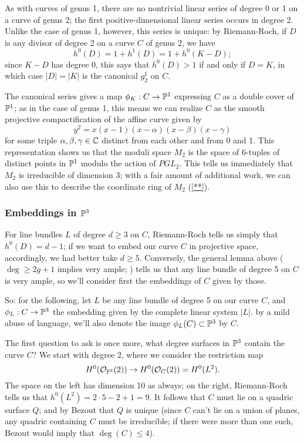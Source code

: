 As with curves of genus 1, there are no nontrivial linear series of degree 0 or 1 on a curve of genus 2; the first positive-dimensional linear series occurs in degree 2. Unlike the case of genus 1, however, this series is unique: by Riemann-Roch, if $D$ is any divisor of degree 2 on a curve $C$ of genus 2, we have
$$
h^0(D) = 1 + h^1(D) = 1 + h^0(K-D);
$$
since $K-D$ has degree 0, this says that $h^0(D) > 1$ if and only if $D=K$, in which case $|D| = |K|$ is the canonical $g^1_2$ on $C$.

The canonical series gives a map $\phi_K : C \to \PP^1$ expressing $C$ as a double cover of $\PP^1$; as in the case of genus 1, this means we can realize $C$ as the smooth projective compactification of the affine curve given by
$$
y^2 = x(x-1)(x - \alpha)(x - \beta)(x - \gamma)
$$
for some triple $\alpha,\beta,\gamma \in \CC$ distinct from each other and from 0 and 1. This representation shows us that the moduli space $M_2$ is the space of 6-tuples of distinct points in $\PP^1$ modulo the action of $PGL_2$. This tells us immediately that $M_2$ is irreducible of dimension 3; with a fair amount of additional work, we can also use this to describe the coordinate ring of $M_2$ (\ref{**}).

\subsubsection{Embeddings in $\PP^3$}

For line bundles $L$ of degree $d \geq 3$ on $C$, Riemann-Roch tells us simply that $h^0(D) = d - 1$; if we want to embed our curve $C$ in projective space, accordingly, we had better take $d \geq 5$. Conversely, the general lemma above ($\deg \geq 2g+1$ implies very ample; \cite{**}) tells us that any line bundle of degree 5 on $C$ is very ample, so we'll consider first the embeddings of $C$ given by those.

So: for the following, let $L$ be any line bundle of degree 5 on our curve $C$, and $\phi_L : C \to \PP^3$ the embedding given by the complete linear system $|L|$. by a mild abuse of language, we'll also denote the image $\phi_L(C) \subset \PP^3$ by $C$.

The first question to ask is once more, what degree surfaces in $\PP^3$ contain the curve $C$? We start with degree 2, where we consider the restriction map
$$
H^0(\cO_{\PP^3}(2)) \to H^0(\cO_C(2)) = H^0(L^2).
$$
The space on the left has dimension 10 as always; on the right, Riemann-Roch tells us that $h^0(L^2) = 2\cdot5 - 2 + 1 = 9$. It follows that $C$ must lie on a quadric surface $Q$; and by Bezout that $Q$ is unique (since $C$ can't lie on a union of planes, any quadric containing $C$ must be irreducible; if there were more than one such, Bezout would imply that $\deg(C) \leq 4$).


